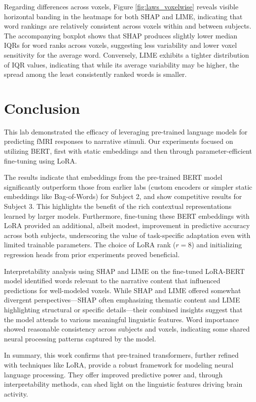 \documentclass[10pt,letterpaper]{article}
\begin{document}
Regarding differences across voxels, Figure \ref{fig:laws_voxelwise} reveals visible horizontal banding in the heatmaps for both SHAP and LIME, indicating that word rankings are relatively consistent across voxels within and between subjects. The accompanying boxplot shows that SHAP produces slightly lower median IQRs for word ranks across voxels, suggesting less variability and lower voxel sensitivity for the average word. Conversely, LIME exhibits a tighter distribution of IQR values, indicating that while its average variability may be higher, the spread among the least consistently ranked words is smaller.



\section{Conclusion}

This lab demonstrated the efficacy of leveraging pre-trained language models for predicting fMRI responses to narrative stimuli. Our experiments focused on utilizing BERT, first with static embeddings and then through parameter-efficient fine-tuning using LoRA.

The results indicate that embeddings from the pre-trained BERT model significantly outperform those from earlier labs (custom encoders or simpler static embeddings like Bag-of-Words) for Subject 2, and show competitive results for Subject 3. This highlights the benefit of the rich contextual representations learned by larger models. Furthermore, fine-tuning these BERT embeddings with LoRA provided an additional, albeit modest, improvement in predictive accuracy across both subjects, underscoring the value of task-specific adaptation even with limited trainable parameters. The choice of LoRA rank (\(r=8\)) and initializing regression heads from prior experiments proved beneficial.

Interpretability analysis using SHAP and LIME on the fine-tuned LoRA-BERT model identified words relevant to the narrative content that influenced predictions for well-modeled voxels. While SHAP and LIME offered somewhat divergent perspectives—SHAP often emphasizing thematic content and LIME highlighting structural or specific details—their combined insights suggest that the model attends to various meaningful linguistic features. Word importance showed reasonable consistency across subjects and voxels, indicating some shared neural processing patterns captured by the model.

In summary, this work confirms that pre-trained transformers, further refined with techniques like LoRA, provide a robust framework for modeling neural language processing. They offer improved predictive power and, through interpretability methods, can shed light on the linguistic features driving brain activity.
\end{document}
